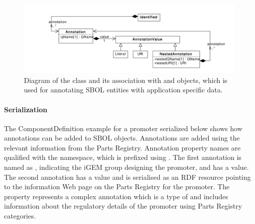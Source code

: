 \begin{figure}[!ht]
\begin{center}
\includegraphics[scale=0.6]{uml/identified_annotations}
\caption[]{Diagram of the  class and its association with  and  objects, which is used for annotating SBOL entities with application specific data.}
\label{uml:identified_annotations}
\end{center}
\end{figure}

\paragraph{Serialization}
The ComponentDefinition example for a promoter serialized below shows how annotations can be added to SBOL objects. Annotations are added using the relevant information from the Parts Registry. Annotation property names are qualified with the  namespace, which is prefixed using . The first annotation is named as , indicating the iGEM group designing the promoter, and has a  value. The second  annotation has a  value and is serialised as an RDF resource pointing to the information Web page on the Parts Registry for the promoter. The   property represents a complex annotation which is a type of  and includes information about the regulatory details of the promoter using Parts Registry categories.   



